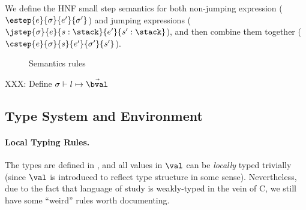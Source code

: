 We define the HNF small step semantics for both non-jumping expression ($\estep{e}{\sigma}{e'}{\sigma'}$) and
jumping expressions ($\jstep{\sigma}{e}{s: \stack}{e'}{s': \stack}$),
and then combine them together ($\cstep{e}{\sigma}{s}{e'}{\sigma'}{s'}$).

\begin{figure}
\begin{mathpar}











\end{mathpar}
\caption{Semantics rules}
\end{figure}

XXX: Define $\sigma \vdash l \mapsto \vec \bval$

\subsection{Type System and Environment}

\paragraph{Local Typing Rules.}

The types are defined in , and all values in $\val$ can be \emph{locally} typed trivially (since $\val$ is introduced to reflect type structure in some sense). Nevertheless, due to the fact that language of study is weakly-typed in the vein of C, we still have some ``weird'' rules worth documenting.

